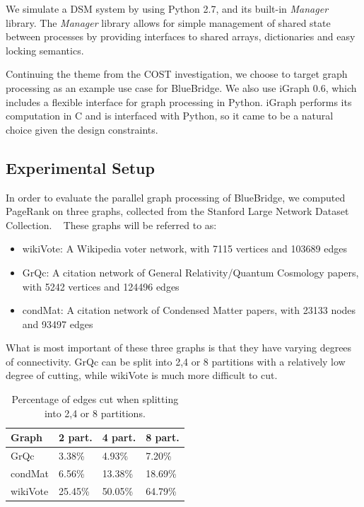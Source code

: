 We simulate a DSM system by using Python 2.7, and its built-in \textit{Manager}
library. The \textit{Manager} library allows for simple management of shared
state between processes by providing interfaces to shared arrays, dictionaries
and easy locking semantics. 

Continuing the theme from the COST investigation, we choose to target graph
processing as an example use case for BlueBridge. We also use iGraph 0.6, which
includes a flexible interface for graph processing in Python. iGraph performs
its computation in C and is interfaced with Python, so it came to be a natural 
choice given the design constraints.

\subsection{Experimental Setup}

In order to evaluate the parallel graph processing of BlueBridge, we computed 
PageRank on three graphs, collected from the Stanford Large Network Dataset 
Collection. ~\cite{snapnets} These graphs will be referred to as:

\begin{itemize}
	\item wikiVote: A Wikipedia voter network, with 7115 vertices and 103689 edges
	\item GrQc: A citation network of General Relativity/Quantum Cosmology papers, with 5242 vertices and 124496 edges
	\item condMat: A citation network of Condensed Matter papers, with 23133 nodes and 93497 edges
\end{itemize}

What is most important of these three graphs is that they have varying degrees of
connectivity. GrQc can be split into 2,4 or 8 partitions with a relatively low degree
of cutting, while wikiVote is much more difficult to cut.

\begin{table}[h]
\begin{tabularx}{\linewidth}{|X|X|X|X|}
\hline
Graph & 2 part. & 4 part. & 8 part. \\ \hline \hline
GrQc & 3.38\% & 4.93\% & 7.20\% \\ \hline
condMat & 6.56\% & 13.38\% & 18.69\% \\ \hline
wikiVote & 25.45\% & 50.05\% & 64.79\% \\ \hline
\end{tabularx}
\caption{Percentage of edges cut when splitting into 2,4 or 8 partitions.}
\end{table}

